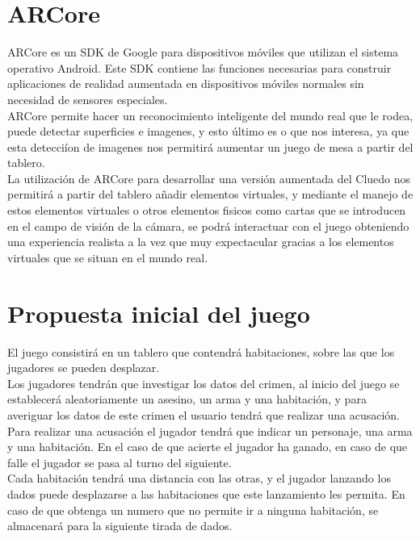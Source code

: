 \section{ARCore}
ARCore es un SDK de Google para dispositivos móviles que utilizan el sistema operativo Android. Este SDK contiene las funciones necesarias para construir aplicaciones de realidad aumentada en dispositivos móviles normales sin necesidad de sensores especiales.\\

ARCore permite hacer un reconocimiento inteligente del mundo real que le rodea, puede detectar superficies e imagenes, y esto último es o que nos interesa, ya que esta detecciíon de imagenes nos permitirá aumentar un juego de mesa a partir del tablero.\\

La utilización de ARCore para desarrollar una versión aumentada del Cluedo nos permitirá a partir del tablero añadir elementos virtuales, y mediante el manejo de estos elementos virtuales o otros elementos fisicos como cartas que se introducen en el campo de visión de la cámara, se podrá interactuar con el juego obteniendo una experiencia realista a la vez que muy expectacular gracias a los elementos virtuales que se situan en el mundo real.

\section{Propuesta inicial del juego}
El juego consistirá en un tablero que contendrá habitaciones, sobre las que los jugadores se pueden desplazar.\\

Los jugadores tendrán que investigar los datos del crimen, al inicio del juego se establecerá aleatoriamente un asesino, un arma y una habitación, y para averiguar los datos de este crimen el usuario tendrá que realizar una acusación.\\

Para realizar una acusación el jugador tendrá que indicar un personaje, una arma y una habitación. En el caso de que acierte el jugador ha ganado, en caso de que falle el jugador se pasa al turno del siguiente.\\

Cada habitación tendrá una distancia con las otras, y el jugador lanzando los dados puede desplazarse a las habitaciones que este lanzamiento les permita. En caso de que obtenga un numero que no permite ir a ninguna habitación, se almacenará para la siguiente tirada de dados.\\

